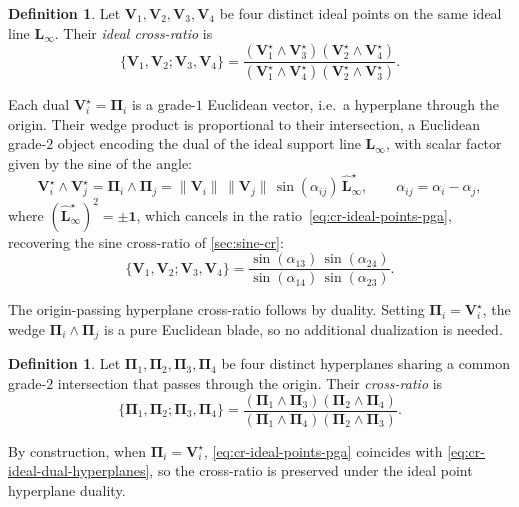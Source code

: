 \documentclass{birkjour}
\theoremstyle{definition}
\newtheorem{definition}[theorem]{Definition}
\theoremstyle{remark}
\begin{document}
\begin{definition}
Let $\mathbf{V}_1, \mathbf{V}_2, \mathbf{V}_3, \mathbf{V}_4$ be four distinct ideal points on the same ideal line $\mathbf{L}_\infty$. Their \emph{ideal cross-ratio} is
\begin{equation}
  \{\mathbf{V}_1, \mathbf{V}_2; \mathbf{V}_3, \mathbf{V}_4\}
  = \frac{(\mathbf{V}_1^\star \wedge \mathbf{V}_3^\star)
          (\mathbf{V}_2^\star \wedge \mathbf{V}_4^\star)}
         {(\mathbf{V}_1^\star \wedge \mathbf{V}_4^\star)
          (\mathbf{V}_2^\star \wedge \mathbf{V}_3^\star)}.
  \label{eq:cr-ideal-points-pga}
\end{equation}
\end{definition}
Each dual $\mathbf{V}_i^\star = \boldsymbol{\Pi}_i$ is a grade-$1$ Euclidean vector, i.e.\ a hyperplane through the origin. Their wedge product is proportional to their intersection, a Euclidean grade-$2$ object encoding the dual of the ideal support line $\mathbf{L}_\infty$, with scalar factor given by the sine of the angle:
\begin{equation}
  \mathbf{V}_i^\star \wedge \mathbf{V}_j^\star
  = \boldsymbol{\Pi}_i \wedge \boldsymbol{\Pi}_j
  = \|\mathbf{V}_i\|\,\|\mathbf{V}_j\|\,\sin(\alpha_{ij})\,\hat{\mathbf{L}}_\infty^\star,
  \qquad \alpha_{ij} = \alpha_i - \alpha_j,
\end{equation}
where $(\hat{\mathbf{L}}_\infty^\star)^2 = \pm \mathbf{1}$, which cancels in the
ratio~\eqref{eq:cr-ideal-points-pga}, recovering the sine cross-ratio
of \cref{sec:sine-cr}:
\begin{equation}
  \{\mathbf{V}_1, \mathbf{V}_2; \mathbf{V}_3, \mathbf{V}_4\}
  = \frac{\sin(\alpha_{13})\,\sin(\alpha_{24})}
         {\sin(\alpha_{14})\,\sin(\alpha_{23})}.
\end{equation}

The origin-passing hyperplane cross-ratio follows by duality. Setting $\boldsymbol{\Pi}_i = \mathbf{V}_i^\star$, the wedge $\boldsymbol{\Pi}_i \wedge \boldsymbol{\Pi}_j$ is a pure Euclidean blade, so no additional dualization is needed.

\begin{definition}
\label{def:cr-origin-hyperplanes-pga}
Let $\boldsymbol{\Pi}_1, \boldsymbol{\Pi}_2, \boldsymbol{\Pi}_3, \boldsymbol{\Pi}_4$ be four distinct hyperplanes sharing a common grade-$2$ intersection that passes through the origin. Their \emph{cross-ratio} is
\begin{equation}
  \{\boldsymbol{\Pi}_1, \boldsymbol{\Pi}_2;
    \boldsymbol{\Pi}_3, \boldsymbol{\Pi}_4\}
  =
  \frac{(\boldsymbol{\Pi}_1 \wedge \boldsymbol{\Pi}_3)
        (\boldsymbol{\Pi}_2 \wedge \boldsymbol{\Pi}_4)}
       {(\boldsymbol{\Pi}_1 \wedge \boldsymbol{\Pi}_4)
        (\boldsymbol{\Pi}_2 \wedge \boldsymbol{\Pi}_3)}.
  \label{eq:cr-ideal-dual-hyperplanes}
\end{equation}
\end{definition}
By construction, when $\boldsymbol{\Pi}_i = \mathbf{V}_i^\star$, \eqref{eq:cr-ideal-points-pga} coincides with \eqref{eq:cr-ideal-dual-hyperplanes}, so the cross-ratio is preserved under the ideal point hyperplane duality.
\end{document}
